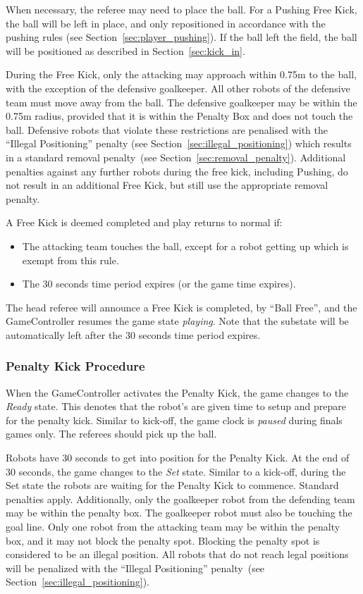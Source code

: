 \documentclass[12pt]{article}
\newcommand{\cf}{see\xspace}
\newcommand{\FreeKickTime}{30 seconds\xspace}
\newcommand{\FreeKickRadius}{0.75m\xspace}
\newcommand{\PenaltyFreeKickSetupTime}{30 seconds\xspace}
\begin{document}
When necessary, the referee may need to place the ball.
For a Pushing Free Kick, the ball will be left in place, and only repositioned in accordance with the pushing rules (see Section~\ref{sec:player_pushing}).
If the ball left the field, the ball will be positioned as described in Section~\ref{sec:kick_in}.

During the Free Kick, only the attacking may approach within \FreeKickRadius to the ball, with the exception of the defensive goalkeeper. All other robots of the defensive team must move away from the ball. The defensive goalkeeper may be within the \FreeKickRadius radius, provided that it is within the Penalty Box and does not touch the ball. Defensive robots that violate these restrictions are penalised with the ``Illegal Positioning'' penalty (see Section~\ref{sec:illegal_positioning}) which results in a standard removal penalty~(see Section~\ref{sec:removal_penalty}). 
Additional penalties against any further robots during the free kick, including Pushing, do not result in an additional Free Kick, but still use the appropriate removal penalty.

A Free Kick is deemed completed and play returns to normal if:
\begin{itemize}
    \item The attacking team touches the ball, except for a robot getting up which is exempt from this rule.
    \item The \FreeKickTime time period expires (or the game time expires).
\end{itemize}
The head referee will announce a Free Kick is completed, by ``Ball Free'', and the GameController
resumes the game state \emph{playing}. Note that the substate will be automatically left after the \FreeKickTime time period expires.

\subsubsection{Penalty Kick Procedure}
\label{sec:penalty_free_kick}

When the GameController activates the Penalty Kick, the game changes to the \textit{Ready} state.
This denotes that the robot's are given time to setup and prepare for the penalty kick. 
Similar to kick-off, the game clock is \textit{paused} during finals games only.
The referees should pick up the ball.

Robots have \PenaltyFreeKickSetupTime to get into position for the Penalty Kick. At the end of 30 seconds, the game changes to the \textit{Set} state.
Similar to a kick-off, during the Set state the robots are waiting for the Penalty Kick to commence.
Standard penalties apply.
Additionally, only the goalkeeper robot from the defending team may be within the penalty box. The goalkeeper robot must also be touching the goal line. 
Only one robot from the attacking team may be within the penalty box, and it may not block the penalty spot.
Blocking the penalty spot is considered to be an illegal position.
All robots that do not reach legal positions will be penalized with the ``Illegal Positioning'' penalty~(\cf Section~\ref{sec:illegal_positioning}).
\end{document}
